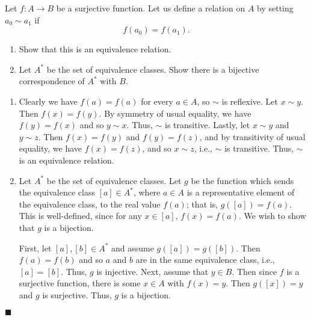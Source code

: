 \documentclass[12pt]{article}
\renewcommand{\qed}{\hfill$\blacksquare$}
\renewenvironment{proof}{\begin{addmargin}[1em]{0em}\begin{newproof}}{\end{newproof}\end{addmargin}\qed}
\newenvironment{problem}[2][Exercise]{\begin{trivlist}
\item[\hskip \labelsep {\bfseries #1}\hskip \labelsep {\bfseries #2.}]}{\end{trivlist}}
\begin{document}
\begin{problem}{1.3.4}
Let $f:A\rightarrow B$ be a surjective function. Let us define a relation on $A$ by setting $a_0 \sim a_1$ if \[ f\left(a_0\right) = f\left(a_1\right). \]
\begin{enumerate}[label=(\alph*)]
	\item Show that this is an equivalence relation.
	\item Let $A^*$ be the set of equivalence classes. Show there is a bijective correspondence of $A^*$ with $B$.
\end{enumerate}
\end{problem}
\begin{proof}
\begin{enumerate}[label=(\alph*)]
	\item Clearly we have $f\left(a\right) = f\left(a\right)$ for every $a\in A$, so $\sim$ is reflexive. Let $x \sim y$. Then $f\left(x\right) = f\left(y\right)$. By symmetry of usual equality, we have $f\left(y\right) = f\left(x\right)$ and so $y\sim x$. Thus, $\sim$ is transitive. Lastly, let $x\sim y$ and $y\sim z$. Then $f\left(x\right) = f\left(y\right)$ and $f\left(y\right) = f\left(z\right)$, and by transitivity of usual equality, we have $f\left(x\right) = f\left(z\right)$, and so $x\sim z$, i.e., $\sim$ is transitive. Thus, $\sim$ is an equivalence relation.
	
	\item Let $A^*$ be the set of equivalence classes. Let $g$ be the function which sends the equivalence class $\left[ a\right] \in A^*$, where $a \in A$ is a representative element of the equivalence class, to the real value $f\left(a\right)$; that is, $g\left(\left[a\right]\right) = f\left(a\right)$. This is well-defined, since for any $x \in \left[a\right]$, $f\left(x\right) = f\left(a\right)$. We wish to show that $g$ is a bijection.
	
	First, let $\left[a\right], \left[b\right] \in A^*$ and assume $g\left(\left[a\right]\right) = g\left(\left[b\right]\right)$. Then $f\left(a\right) = f\left(b\right)$ and so $a$ and $b$ are in the same equivalence class, i.e., $\left[a\right]=\left[b\right]$. Thus, $g$ is injective. Next, assume that $ y \in B$. Then since $f$ is a surjective function, there is some $x \in A$ with $f\left(x\right) = y$. Then $g\left(\left[x\right]\right) = y$ and $g$ is surjective. Thus, $g$ is a bijection.
\end{enumerate}
\end{proof}
\end{document}
